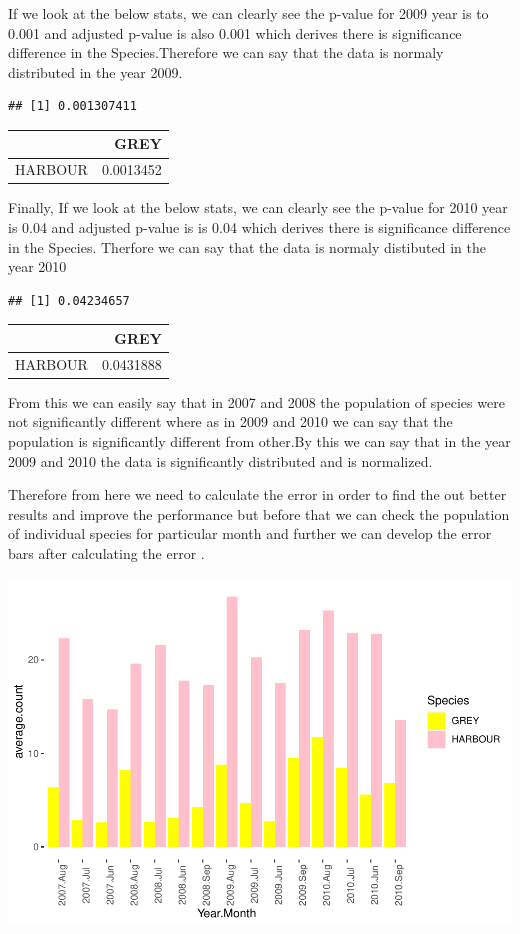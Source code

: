\documentclass[
]{article}
\begin{document}
If we look at the below stats, we can clearly see the p-value for 2009
year is to 0.001 and adjusted p-value is also 0.001 which derives there
is significance difference in the Species.Therefore we can say that the
data is normaly distributed in the year 2009.

\begin{verbatim}
## [1] 0.001307411
\end{verbatim}

\begin{longtable}[]{@{}lr@{}}
\toprule
& GREY\tabularnewline
\midrule
\endhead
HARBOUR & 0.0013452\tabularnewline
\bottomrule
\end{longtable}

Finally, If we look at the below stats, we can clearly see the p-value
for 2010 year is 0.04 and adjusted p-value is is 0.04 which derives
there is significance difference in the Species. Therfore we can say
that the data is normaly distibuted in the year 2010

\begin{verbatim}
## [1] 0.04234657
\end{verbatim}

\begin{longtable}[]{@{}lr@{}}
\toprule
& GREY\tabularnewline
\midrule
\endhead
HARBOUR & 0.0431888\tabularnewline
\bottomrule
\end{longtable}

From this we can easily say that in 2007 and 2008 the population of
species were not significantly different where as in 2009 and 2010 we
can say that the population is significantly different from other.By
this we can say that in the year 2009 and 2010 the data is significantly
distributed and is normalized.

Therefore from here we need to calculate the error in order to find the
out better results and improve the performance but before that we can
check the population of individual species for particular month and
further we can develop the error bars after calculating the error .

\includegraphics{Statistical-analysis-in-RStudio_files/figure-latex/unnamed-chunk-31-1.pdf}
\end{document}
